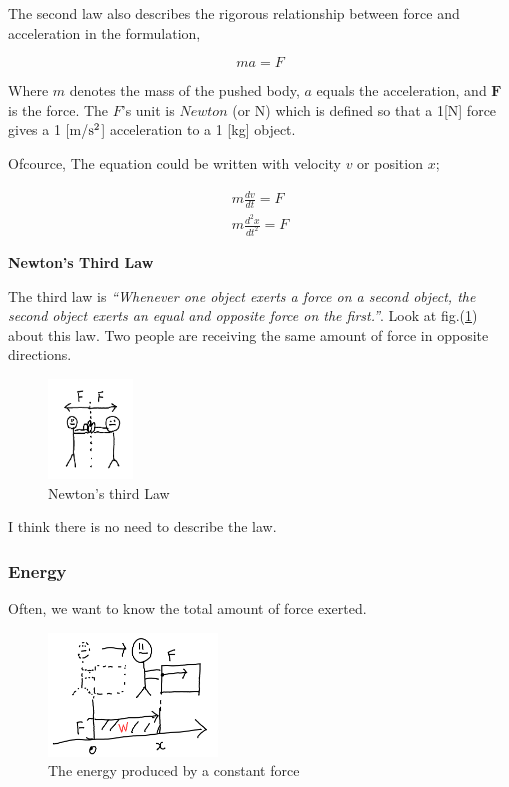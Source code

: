 \documentclass[pdflatex,sn-mathphys-num]{sn-jnl}%
\theoremstyle{thmstyleone}%
\theoremstyle{thmstyletwo}%
\theoremstyle{thmstylethree}%
\begin{document}
The second law also describes the rigorous relationship between force and acceleration in the formulation, 

\begin{equation}
	ma = F
\end{equation}

Where $m$ denotes the mass of the pushed body, $a$ equals the acceleration, and $\boldsymbol{F}$ is the force. The $F$'s unit is $Newton$ (or N) which is defined so that a 1[N] force gives a 1 [m/$\rm s^2$] acceleration to a 1 [kg] object.

Ofcource, The equation could be written with velocity $v$ or position $x$;

\begin{eqnarray}
	m\frac{dv}{dt} = F\\
	m\frac{d^2 x}{dt^2} = F
\end{eqnarray}

\vspace{2truemm}

{\noindent\rm\bf\large Newton's Third Law}

The third law is {\sl ``Whenever one object exerts a force on a second object, the second object exerts an equal and opposite force on the first.''}. Look at fig.(\ref{NewT}) about this law. Two people are receiving the same amount of force in opposite directions.

\begin{figure}[H]
	\centering
	\includegraphics[width=0.2\textwidth]{images/NewtonsThirdLaw.png}
	\caption{Newton's third Law}
	\label{NewT}
\end{figure}

I think there is no need to describe the law.

\subsubsection{Energy}\label{BasicEnergy}

Often, we want to know the total amount of force exerted.

\begin{figure}[H]
	\centering
	\includegraphics[width=0.4\textwidth]{images/constantForceEnergy.png}
	\caption{The energy produced by a constant force}
	\label{constForceEnergy}
\end{figure}
\end{document}
